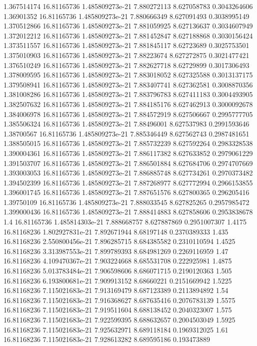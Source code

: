 {1.367514174 16.81165736 1.485809273e-21 7.880272113 8.627058783 0.3043264606
1.36901352 16.81165736 1.485809273e-21 7.880666349 8.627091493 0.3038995149
1.370512866 16.81165736 1.485809273e-21 7.881059925 8.627136637 0.3034607949
1.372012212 16.81165736 1.485809273e-21 7.881452847 8.627188868 0.3030156424
1.373511557 16.81165736 1.485809273e-21 7.881845117 8.62723689 0.3025753501
1.375010903 16.81165736 1.485809273e-21 7.88223674 8.627272875 0.3021477421
1.376510249 16.81165736 1.485809273e-21 7.882627718 8.62729899 0.3017306493
1.378009595 16.81165736 1.485809273e-21 7.883018052 8.627325588 0.3013137175
1.379508941 16.81165736 1.485809273e-21 7.883407741 8.627362581 0.3008870356
1.381008286 16.81165736 1.485809273e-21 7.883796783 8.627411183 0.3004493905
1.382507632 16.81165736 1.485809273e-21 7.884185176 8.627462913 0.3000092678
1.384006978 16.81165736 1.485809273e-21 7.884572919 8.627506667 0.2995777705
1.385506324 16.81165736 1.485809273e-21 7.88496001 8.627537983 0.2991593646
1.38700567 16.81165736 1.485809273e-21 7.885346449 8.627562743 0.2987481651
1.388505015 16.81165736 1.485809273e-21 7.885732239 8.627592264 0.2983328538
1.390004361 16.81165736 1.485809273e-21 7.886117382 8.627633852 0.2979061229
1.391503707 16.81165736 1.485809273e-21 7.886501884 8.627684706 0.2974707669
1.393003053 16.81165736 1.485809273e-21 7.886885748 8.627734261 0.2970373482
1.394502399 16.81165736 1.485809273e-21 7.887268977 8.627772994 0.2966153855
1.396001745 16.81165736 1.485809273e-21 7.887651576 8.627800365 0.296205416
1.39750109 16.81165736 1.485809273e-21 7.888033545 8.627825265 0.2957985472
1.399000436 16.81165736 1.485809273e-21 7.888414883 8.627858606 0.2953838678
1.4 16.81165736 1.485814303e-21 7.888668757 8.627887869 0.2951007307
1.4175 16.81168236 1.802927831e-21 7.892671944 8.68197148 0.2370389333
1.435 16.81168236 2.550800456e-21 7.896285715 8.684385582 0.2310110594
1.4525 16.81168236 3.313987553e-21 7.899789393 8.684981269 0.2269116959
1.47 16.81168236 4.109470367e-21 7.903224668 8.685531708 0.222925981
1.4875 16.81168236 5.013783484e-21 7.906598606 8.686071715 0.2190120363
1.505 16.81168236 6.193800681e-21 7.909913152 8.68660221 0.2151669942
1.5225 16.81168236 7.115021683e-21 7.913169479 8.687123389 0.2113894892
1.54 16.81168236 7.115021683e-21 7.916368627 8.687635416 0.2076783139
1.5575 16.81168236 7.115021683e-21 7.919511604 8.688138452 0.2040323007
1.575 16.81168236 7.115021683e-21 7.922599395 8.688632657 0.2004503049
1.5925 16.81168236 7.115021683e-21 7.925632971 8.689118184 0.1969312025
1.61 16.81168236 7.115021683e-21 7.928613282 8.689595186 0.193473889
}
